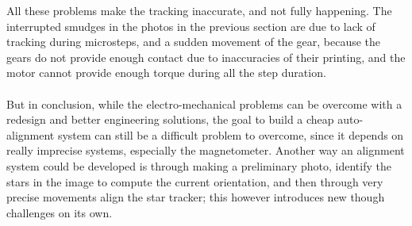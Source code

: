 \documentclass[]{article}
\begin{document}
All these problems make the tracking inaccurate, and not fully happening. The interrupted smudges in the photos in the previous section are due to lack of tracking during microsteps, and a sudden movement of the gear, because the gears do not provide enough contact due to inaccuracies of their printing, and the motor cannot provide enough torque during all the step duration. 
\\
\\
But in conclusion, while the electro-mechanical problems can be overcome with a redesign and better engineering solutions, the goal to build a cheap auto-alignment system can still be a difficult problem to overcome, since it depends on really imprecise systems, especially the magnetometer. Another way an alignment system could be developed is through making a preliminary photo, identify the stars in the image to compute the current orientation, and then through very precise movements align the star tracker; this however introduces new though challenges on its own.

\newpage
\tableofcontents
\end{document}
